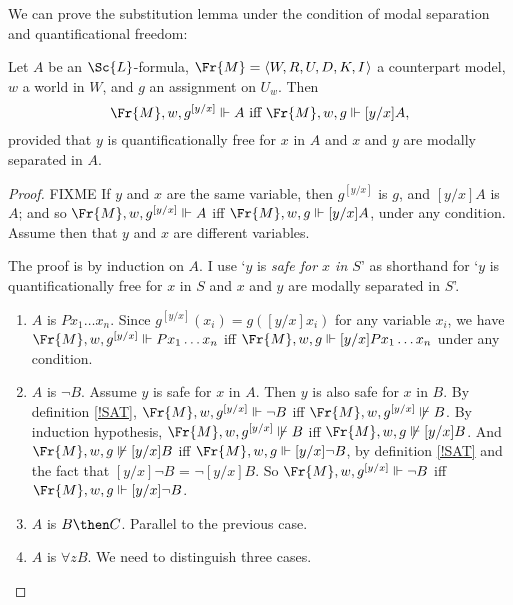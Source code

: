 \documentclass[11pt]{woarticle}
\theoremstyle{break}
\theoremstyle{nonumberplain}
\newcommand{\SAT}{\Vdash}
\newcommand{\1}{\;\,|\;\,}
\renewcommand{\t}[1]{\ensuremath{\langle #1  \makebox[.2ex]{}\rangle}}
\begin{document}
We can prove the substitution lemma under the condition of modal separation and
quantificational freedom:

\begin{lemma}\label{rsl}
  Let $A$ be an $\Sc{L}$-formula, $\Fr{M} = \t{W,R,U,D,K,I}$ a counterpart
  model, $w$ a world in $W$, and $g$ an assignment on $U_{w}$. Then
  \[
    \Fr{M},w,g^{[y/x]} \SAT A \text{ iff } \Fr{M},w,g \SAT [y/x]A,
  \]
  provided that $y$ is quantificationally free for $x$ in $A$ and $x$ and $y$
  are modally separated in $A$.
\end{lemma}

\begin{proof}
  FIXME
  If $y$ and $x$ are the same variable, then $g^{[y/x]}$ is $g$, and $[y/x]A$ is
  $A$; and so $\Fr{M}, w, g^{[y/x]} \SAT A$ iff $\Fr{M}, w,g \SAT [y/x]A$, under
  any condition. Assume then that $y$ and $x$ are different variables.

  The proof is by induction on $A$. I use `$y$ is \emph{safe for $x$ in $S$}' as
  shorthand for `$y$ is quantificationally free for $x$ in $S$ and $x$ and $y$
  are modally separated in $S$'.

  \begin{enumerate}

    \item $A$ is $Px_{1}\ldots x_{n}$. Since $g^{[y/x]}(x_{i}) = g([y/x]x_{i})$
          for any variable $x_{i}$, we have
          $\Fr{M},w,g^{[y/x]} \SAT P x_1\ldots x_n$ iff
          $\Fr{M},w,g \SAT [y/x]P x_1\ldots x_n$ under any condition.
          
    \item $A$ is $\neg B$.\; Assume $y$ is safe for $x$ in $A$. Then $y$ is also
          safe for $x$ in $B$. By definition \ref{!SAT},
          $\Fr{M},w,g^{[y/x]} \SAT \neg B$ iff $\Fr{M},w,g^{[y/x]} \not\SAT B$.
          By induction hypothesis, $\Fr{M},w,g^{[y/x]} \not\SAT B$ iff
          $\Fr{M},w,g \not\SAT [y/x]B$. And $\Fr{M},w,g \not\SAT [y/x]B$ iff
          $\Fr{M},w,g \SAT [y/x]\neg B$, by definition \ref{!SAT} and the fact
          that $[y/x]\neg B$ = $\neg [y/x]B$. So
          $\Fr{M},w,g^{[y/x]} \SAT \neg B$ iff $\Fr{M},w,g \SAT [y/x]\neg B$.

    \item $A$ is $B \then C$.\; Parallel to the previous case.

    \item $A$ is $\forall z B$.\; We need to distinguish three cases.


\end{enumerate}
\end{proof}
\end{document}
